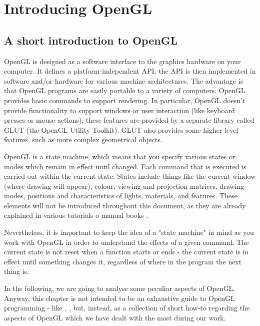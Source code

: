 \section{Introducing OpenGL}
\label{sec:opengl}
\lstset{language=C++}
\subsection{A short introduction to OpenGL}
OpenGL is designed as a software interface to the graphics 
hardware on your computer. It defines a platform-independent API;
the API is then implemented in software and/or hardware for 
various machine architectures. The advantage is that OpenGL 
programs are easily portable to a variety of computers. 
OpenGL provides basic commands to support rendering. 
In particular, OpenGL doesn't provide functionality to support
windows or user interaction (like keyboard presses or mouse 
actions); these features are provided by a separate library called
GLUT (the OpenGL Utility Toolkit). GLUT also provides some 
higher-level features, such as more complex geometrical objects.
%

%
OpenGL is a state machine, which means that you specify various 
states or modes which remain in effect until changed.
Each command that is executed is carried out within the current 
state. States include things like the current window (where
drawing will appear), colour, viewing and projection matrices, 
drawing modes, positions and characteristics of lights,
materials, and features. These elements will not be introduced 
throughout this document, as they are already explained in
various tutorials \cite{opengl:brieftutorial} o manual books 
\cite{opengl:redbook}.
%

%
Nevertheless, it is important to keep the idea of a 
"state machine" in mind as you work with OpenGL in order to 
understand the effects of a given command. The current state 
is not reset when a function starts or ends - the current state
is in effect until something changes it, regardless of where 
in the program the next thing is. 
%

%
In the following, we are going to analyse some peculiar 
aspects of OpenGL. Anyway, this chapter is not intended 
to be an exhaustive guide to OpenGL programming 
- like \cite{opengl:distilled}, \cite{opengl:redbook}, but,
instead, as a collection of short how-to regarding the 
aspects of OpenGL which we have dealt with the most 
during our work. 
%

